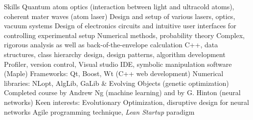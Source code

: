\begin{rubric}{Skills}
\entry*[]%
Quantum atom optics (interaction between light and ultracold atoms), coherent mater waves (atom laser)
\entry*[]%
Design and setup of various lasers, optics, vacuum systems 
\entry*[]%
Design of electronics circuits and intuitive user interfaces for controlling experimental setup
%
%
\entry*[]%
Numerical methods, probability theory%
\entry*[]%
Complex, rigorous analysis as well as back-of-the-envelope calculation
%
%
\entry*[]%
C++, data structures, class hierarchy design, design patterns, algorithm development
\entry*[]%
Profiler, version control, Visual studio IDE, symbolic manipulation software (Maple)
\entry*[]%
Frameworks: Qt, Boost, Wt (C++ web development)
\entry*[]%
Numerical libraries: NLopt, AlgLib, GaLib \& Evolving Objects (genetic optimization)
\entry*[]%
Completed course by Andrew Ng (machine learning) and by G. Hinton (neural networks)
\entry*[]%
Keen interests: Evolutionary Optimization, disruptive design for neural networks
\entry*[]%
Agile programming technique, \textit{Lean Startup} paradigm
%
%
\end{rubric}
